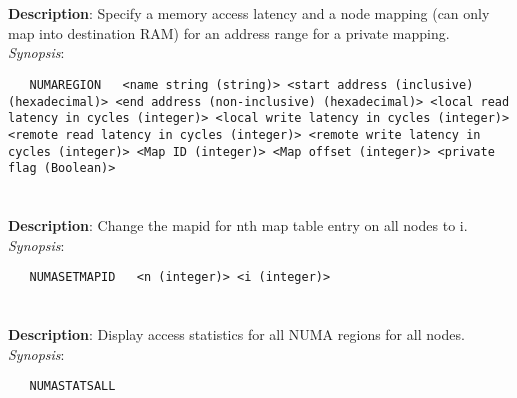 \section{\quad{}}
\label{manpages:NUMAREGION}
\label{manpages:numaregion}
\vspace{-0.1in}
{\bf Description}: 	Specify a memory access latency and a node mapping (can only map into destination RAM) for an address range for a private mapping.\\[1.5ex]
{\em Synopsis}:
\vspace{-0.05in}
\scriptsize
\begin{lstlisting}
   NUMAREGION   <name string (string)> <start address (inclusive) (hexadecimal)> <end address (non-inclusive) (hexadecimal)> <local read latency in cycles (integer)> <local write latency in cycles (integer)> <remote read latency in cycles (integer)> <remote write latency in cycles (integer)> <Map ID (integer)> <Map offset (integer)> <private flag (Boolean)> 
\end{lstlisting}
\normalsize
\vspace{-0.05in}


\section{\quad{}}
\label{manpages:NUMASETMAPID}
\label{manpages:numasetmapid}
\vspace{-0.1in}
{\bf Description}: 	Change the mapid for nth map table entry on all nodes to i.\\[1.5ex]
{\em Synopsis}:
\vspace{-0.05in}
\scriptsize
\begin{lstlisting}
   NUMASETMAPID   <n (integer)> <i (integer)>															
\end{lstlisting}
\normalsize
\vspace{-0.05in}


\section{\quad{}}
\label{manpages:NUMASTATSALL}
\label{manpages:numastatsall}
\vspace{-0.1in}
{\bf Description}: 	Display access statistics for all NUMA regions for all nodes.\\[1.5ex]
{\em Synopsis}:
\vspace{-0.05in}
\scriptsize
\begin{lstlisting}
   NUMASTATSALL   																	
\end{lstlisting}
\normalsize
\vspace{-0.05in}



